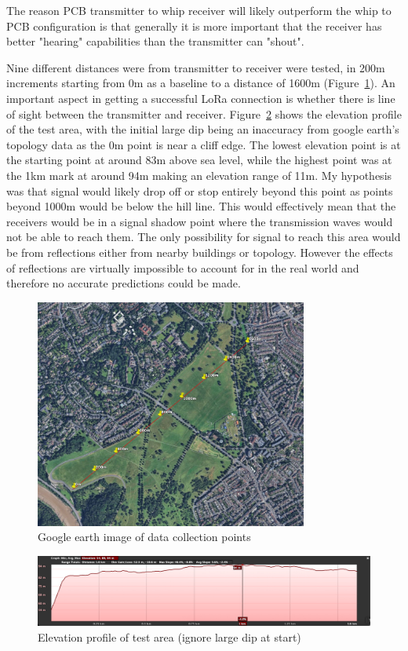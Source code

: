 The reason PCB transmitter to whip receiver will likely outperform the whip to
PCB configuration is that generally it is more important that the receiver has
better "hearing" capabilities than the transmitter can "shout".

Nine different distances were from transmitter to receiver were tested, in 200m
increments starting from 0m as a baseline to a distance of 1600m
(Figure~\ref{fig:range-test-markers}). An important aspect in getting a
successful LoRa connection is whether there is line of sight between the
transmitter and receiver. Figure~\ref{fig:range-test-elevation} shows the
elevation profile of the test area, with the initial large dip being an
inaccuracy from google earth's topology data as the 0m point is near a cliff
edge. The lowest elevation point is at the starting point at around 83m above
sea level, while the highest point was at the 1km mark at around 94m making an
elevation range of 11m. My hypothesis was that signal would likely drop off or
stop entirely beyond this point as points beyond 1000m would be below the hill
line. This would effectively mean that the receivers would be in a signal shadow
point where the transmission waves would not be able to reach them. The only
possibility for signal to reach this area would be from reflections either from
nearby buildings or topology. However the effects of reflections are virtually
impossible to account for in the real world and therefore no accurate
predictions could be made.

\begin{figure}[H]
    \centering
    \includegraphics[width=0.8\textwidth]{contents/23-hw-development/23-fig/range-test-markers.jpg}
    \caption{Google earth image of data collection points}
    \label{fig:range-test-markers}
\end{figure}


\begin{figure}[H]
    \centering
    \includegraphics[width=1\textwidth]{contents/23-hw-development/23-fig/range-test-elevation-profile.jpg}
    \caption{Elevation profile of test area (ignore large dip at start)}
    \label{fig:range-test-elevation}
\end{figure}


